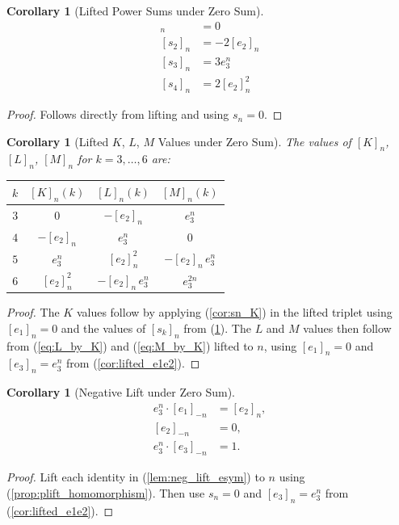 \documentclass[12pt]{article}
\newtheorem{corollary}[theorem]{Corollary}
\theoremstyle{definition}
\newcommand{\lift}[2]{[#1]_{#2}}
\begin{document}
	\begin{corollary}[Lifted Power Sums under Zero Sum]
		\label{cor:lifted_s_values}
		\begin{align*}
			\lift{s_1}{n} &= 0\\
			\lift{s_2}{n} &= -2\lift{e_2}{n}\\
			\lift{s_3}{n} &= 3e_3^n\\
			\lift{s_4}{n} &= 2\lift{e_2}{n}^2
		\end{align*}
	\end{corollary}
	\begin{proof}
		Follows directly from lifting and using $s_n = 0$.
	\end{proof}
	
	\begin{corollary}[Lifted $K$, $L$, $M$ Values under Zero Sum]
		\label{cor:lifted_k_values}
		The values of $\lift{K}{n}$, $\lift{L}{n}$, $\lift{M}{n}$ for $k = 3, \ldots, 6$ are:
		\begin{center}
			\begin{tabular}{c|ccc}
				$k$ & $\lift{K}{n}(k)$ & $\lift{L}{n}(k)$ & $\lift{M}{n}(k)$ \\
				\hline
				$3$ & $0$ & $-\lift{e_2}{n}$ & $e_3^n$ \\
				$4$ & $-\lift{e_2}{n}$ & $e_3^n$ & $0$ \\
				$5$ & $e_3^n$ & $\lift{e_2}{n}^2$ & $-\lift{e_2}{n}\,e_3^n$ \\
				$6$ & $\lift{e_2}{n}^2$ & $-\lift{e_2}{n}\,e_3^n$ & $e_3^{2n}$ \\
			\end{tabular}
		\end{center}
	\end{corollary}
	\begin{proof}
		The $K$ values follow by applying (\ref{cor:sn_K}) in the lifted triplet using $\lift{e_1}{n} = 0$ and the values of $\lift{s_k}{n}$ from (\ref{cor:lifted_s_values}). The $L$ and $M$ values then follow from (\ref{eq:L_by_K}) and (\ref{eq:M_by_K}) lifted to $n$, using $\lift{e_1}{n} = 0$ and $\lift{e_3}{n} = e_3^n$ from (\ref{cor:lifted_e1e2}).
	\end{proof}
	
	\begin{corollary}[Negative Lift under Zero Sum]
		\label{cor:neg_lift_esym_zero_sum}
		\begin{align*}
			e_3^n \cdot \lift{e_1}{-n} &= \lift{e_2}{n}, \\
			\lift{e_2}{-n} &= 0, \\
			e_3^n \cdot \lift{e_3}{-n} &= 1.
		\end{align*}
	\end{corollary}
	\begin{proof}
		Lift each identity in (\ref{lem:neg_lift_esym}) to $n$ using (\ref{prop:plift_homomorphism}). Then use $s_n = 0$ and $\lift{e_3}{n} = e_3^n$
		from (\ref{cor:lifted_e1e2}).
	\end{proof}
	
\end{document}
